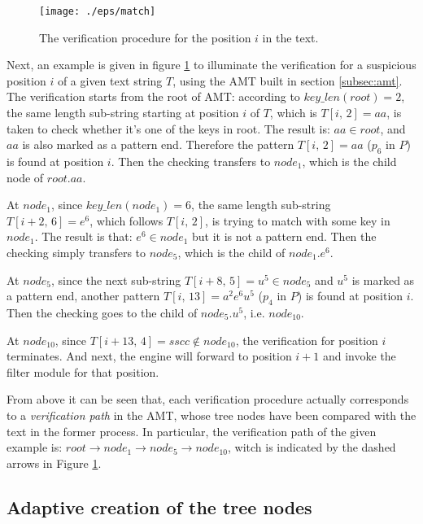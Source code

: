\documentclass{article}
\begin{document}
\begin{figure}[htbp]
  \centering
  \texttt{[image: ./eps/match]}
  \caption{The verification procedure for the position $i$ in the
    text.}
  \label{fig:matching}
\end{figure}

Next, an example is given in figure \ref{fig:matching} to illuminate
the verification for a suspicious position $i$ of a given text string
$T$, using the AMT built in section \ref{subsec:amt}. The verification
starts from the root of AMT: according to $key\_len(root)=2$, the same
length sub-string starting at position $i$ of $T$, which is
$T[i,\,2]=aa$, is taken to check whether it's one of the keys in
root. The result is: $aa \in root$, and $aa$ is also marked as a
pattern end. Therefore the pattern $T[i,\,2]=aa$ ($p_6$ in $P$) is
found at position $i$. Then the checking transfers to $node_1$, which
is the child node of $root.aa$.

At $node_1$, since $key\_len(node_1)=6$, the same length sub-string
$T[i+2,\,6]=e^6$, which follows $T[i,\,2]$, is trying to match with
some key in $node_1$. The result is that: $e^6 \in node_1$ but it is
not a pattern end. Then the checking simply transfers to $node_5$,
which is the child of $node_1.e^6$.

At $node_5$, since the next sub-string $T[i+8,\,5]=u^5 \in node_5$ and
$u^5$ is marked as a pattern end, another pattern
$T[i,\,13]=a^2e^6u^5$ ($p_4$ in $P$) is found at position $i$. Then
the checking goes to the child of $node_5.u^5$, i.e.  $node_{10}$.

At $node_{10}$, since $T[i+13,\,4]=sscc \notin node_{10}$, the
verification for position $i$ terminates. And next, the engine will
forward to position $i+1$ and invoke the filter module for that
position.

From above it can be seen that, each verification procedure actually
corresponds to a \emph{verification path} in the AMT, whose tree nodes
have been compared with the text in the former process. In particular,
the verification path of the given example is:
$root \rightarrow node_1 \rightarrow node_5 \rightarrow node_{10}$,
witch is indicated by the dashed arrows in Figure \ref{fig:matching}.


\subsection{Adaptive creation of the tree nodes}
\label{subsec:nodes}
\end{document}
